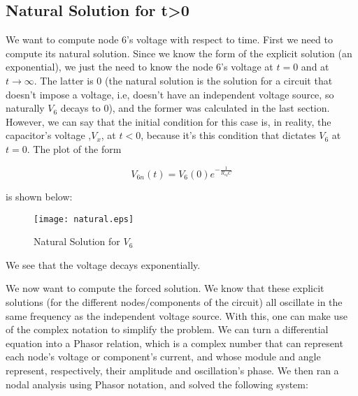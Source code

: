 \subsection{Natural Solution for t>0}
We want to compute node 6's voltage with respect to time. First we need to compute its natural solution. Since we know the form of the explicit solution  (an exponential), we just the need to know the node 6's voltage at $t=0$ and at $t \to \infty $.
The latter is $0$ (the natural solution is the solution for a circuit that doesn't impose a voltage, i.e, doesn't have an independent voltage source, so naturally $V_{6}$ decays to $0$), and the former was calculated in the last section. However, we can say that
the initial condition for this case is, in reality, the capacitor's voltage ,$V_x$, at $t<0$, because it's this condition that dictates $V_6$ at $t=0$. The plot of the form


\begin{center}
\begin{equation}
V_{6n}(t)=V_6(0) e^{-\frac{1}{R_{eq}C}}
\label{ExplicitNaturalSolution}
\end{equation}
\end{center}
is shown below:

\begin{figure}[H]
  \centering
  \texttt{[image: natural.eps]}
  \caption{Natural Solution for $V_{6}$}
  \label{fig:OctaveNaturalSolution}
\end{figure}

We see that the voltage decays exponentially.

We now want to compute the forced solution. We know that these explicit solutions (for the different nodes/components of the circuit) all oscillate in the same frequency as the independent voltage source. With this, one can make use of the complex notation to
simplify the problem. We can turn a differential equation into a Phasor relation, which is a complex number that can represent each node's voltage or component's current, and whose module and angle represent, respectively, their amplitude and oscillation's phase.
We then ran a nodal analysis using Phasor notation, and solved the following system:

